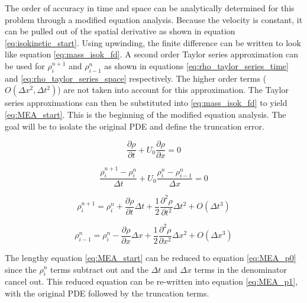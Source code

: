 \documentclass{mc2015}
\begin{document}
    
    The order of accuracy in time and space can be analytically determined for
    this problem through a modified equation analysis. Because the velocity is
    constant, it can be pulled out of the spatial derivative as shown in
    equation \ref{eq:isokinetic_start}. Using upwinding, the finite difference
    can be written to look like equation \ref{eq:mass_isok_fd}.  A second order
    Taylor series approximation can  be used for $\rho_{i}^{n+1}$  and
    $\rho_{i-1}^{n}$ as shown in equations \ref{eq:rho_taylor_series_time} and
    \ref{eq:rho_taylor_series_space} respectively. The higher order terms
    ($O(\Delta x^{2},\Delta t^{2} )$) are not taken into account for this
    approximation. The Taylor series approximations can then be substituted into
    \ref{eq:mass_isok_fd} to yield \ref{eq:MEA_start}. This is the beginning of
    the modified equation analysis. The goal will be to isolate the original PDE
    and define the truncation error.
    
    \begin{equation}
    	\label{eq:isokinetic_start}
    	\frac{\partial \rho}{\partial t} + U_{0} \frac{\partial \rho}{\partial x} = 0
    \end{equation}
    
    \begin{equation}
    	\label{eq:mass_isok_fd}
    	\frac{ \rho_{i}^{n+1} - \rho_{i}^{n} }{\Delta t} 
    	+ U_{0} \frac{\rho_{i}^{n} - \rho_{i-1}^{n}}{\Delta x} = 0
    \end{equation}
    
    \begin{equation}
    	\label{eq:rho_taylor_series_time}
    	\rho_{i}^{n+1} =  \rho_{i}^{n} + 
    	\frac{\partial \rho}{\partial t} \Delta t +
    	\frac{1}{2} \frac{\partial^2 \rho}{\partial t^2} \Delta t^2 + O(\Delta t^{3})
    \end{equation}
    
    \begin{equation}
    	\label{eq:rho_taylor_series_space}
    	\rho_{i-1}^{n} =  \rho_{i}^{n} - 
    	\frac{\partial \rho}{\partial x} \Delta x +
    	\frac{1}{2} \frac{\partial^2 \rho}{\partial x^2} \Delta x^2 + O(\Delta x^{3})
    \end{equation}
    
    The lengthy equation \ref{eq:MEA_start} can be reduced to equation
    \ref{eq:MEA_p0} since the $\rho_{i}^{n}$ terms subtract out and the $\Delta
    t$ and $\Delta x$ terms in the denominator cancel out. This reduced equation
    can be re-written into equation \ref{eq:MEA_p1}, with the original PDE
    followed by the truncation terms. 
    
\end{document}
